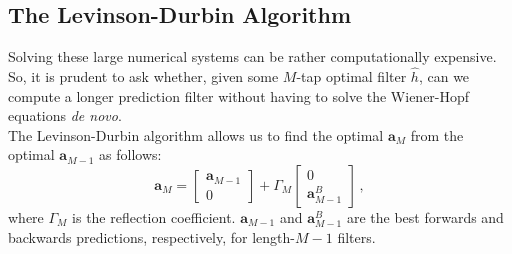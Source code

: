 \subsection{The Levinson-Durbin Algorithm}
%
Solving these large numerical systems can be rather computationally
expensive. So, it is prudent to ask whether, given some $M$-tap
optimal filter $\hat{h}$, can we compute a longer prediction filter
without having to solve the Wiener-Hopf equations \textit{de novo}.\\
%
The Levinson-Durbin algorithm allows us to find the optimal $\mathbf{a}_M$
from the optimal $\mathbf{a}_{M-1}$ as follows:
%
\begin{displaymath}
  \mathbf{a}_M = \left[\begin{array}{c} \mathbf{a}_{M-1} \\ 0 \end{array}\right]
  + \Gamma_M \left[\begin{array}{c} 0 \\ \mathbf{a}_{M-1}^B \end{array}\right] \,,
\end{displaymath}
%
where $\Gamma_M$ is the reflection coefficient. $\mathbf{a}_{M-1}$ and
$\mathbf{a}_{M-1}^B$ are the best forwards and backwards predictions,
respectively, for length-$M-1$ filters.

